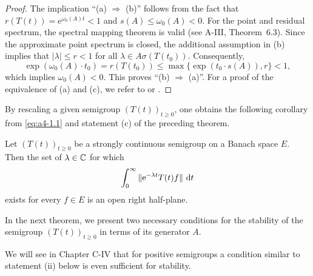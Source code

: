 \begin{proof} The implication ``(a) $ \Rightarrow $ (b)'' follows from the fact that $ r(T(t)) = \mathrm{e}^{\omega_{0}(A) t} < 1 $ and $ s(A) \leq \omega_{0}(A) < 0 $. For the point and residual spectrum, the spectral mapping theorem is valid (see A-III, Theorem~6.3). Since the approximate point spectrum is closed, the additional assumption in (b)
implies that $ |\lambda| \leq r < 1 $ for all $ \lambda \in A\sigma(T(t_0)) $. 
Consequently, 
\[
\exp(\omega_{0}(A) \cdot t_0) = r(T(t_0)) \leq \max\{\exp(t_0 \cdot s(A)), r\} < 1,
\]
which implies $ \omega_{0}(A) < 0 $. 
This proves \textquotedblleft (b) $\Rightarrow$ (a)\textquotedblright. 
For a proof of the equivalence of (a) and (c), we refer to \citet{datko:1972} or \citet[Theorem~4.4.1]{pazy:1983}. 
\end{proof}
By rescaling a given semigroup $ (T(t))_{t \geq 0} $, one obtains the following corollary from \eqref{eq:a4-1.1} and statement (c) of the preceding theorem.
\begin{corollary} \label{cor:a4-1.12} 
Let $ (T(t))_{t \geq 0} $ be a strongly continuous semigroup on a Banach space $ E $. Then the set of $ \lambda \in \mathbb{C}$ for which
\[
\int_{0}^{\infty} \|\mathrm{e}^{-\lambda t} T (t) f \| \,\mathop{}\!\mathrm{d}{t} 
\]
exists for every $ f \in E $  is an open right half-plane.
\end{corollary}
In the next theorem, we present two necessary conditions for the stability of the semigroup $ (T(t))_{t \geq 0} $ in terms of its generator $ A $. 

We will see in Chapter C-IV that for positive semigroups a condition similar to statement (ii) below is even sufficient for stability. 

